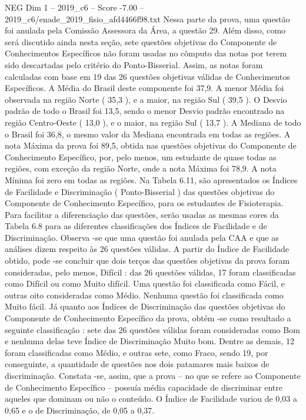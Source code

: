 \begin{textsample}{NEG Dim 1 – 2019\_c6 – Score -7.00 – 2019\_c6/enade\_2019\_fisio\_afd4466f98.txt}
Nessa parte da prova, uma questão foi anulada pela Comissão Assessora da Área, a questão 29.
Além disso, como será discutido ainda nesta seção, sete questões objetivas do Componente de Conhecimentos Específicos não foram usadas no cômputo das notas por terem sido descartadas pelo critério do Ponto-Bisserial.
Assim, as notas foram calculadas com base em 19 das 26 questões objetivas válidas de Conhecimentos Específicos.
A Média do Brasil deste componente foi 37,9.
A menor Média foi observada na região Norte ( 35,3 ), e a maior, na região Sul ( 39,5 ).
O Desvio padrão de todo o Brasil foi 13,5, sendo o menor Desvio padrão encontrado na região Centro-Oeste ( 13,0 ), e o maior, na região Sul ( 13,7 ).
A Mediana de todo o Brasil foi 36,8, o mesmo valor da Mediana encontrada em todas as regiões.
A nota Máxima da prova foi 89,5, obtida nas questões objetivas do Componente de Conhecimento Específico, por, pelo menos, um estudante de quase todas as regiões, com exceção da região Norte, onde a nota Máxima foi 78,9.
A nota Mínima foi zero em todas as regiões.
Na Tabela 6.11, são apresentados os Índices de Facilidade e Discriminação ( Ponto-Bisserial ) das questões objetivas do Componente de Conhecimento Específico, para os estudantes de Fisioterapia.
Para facilitar a diferenciação das questões, serão usadas as mesmas cores da Tabela 6.8 para as diferentes classificações dos Índices de Facilidade e de Discriminação.
Observa -se que uma questão foi anulada pela CAA e que as análises dizem respeito às 26 questões válidas.
A partir do Índice de Facilidade obtido, pode -se concluir que dois terços das questões objetivas da prova foram consideradas, pelo menos, Difícil : das 26 questões válidas, 17 foram classificadas como Difícil ou como Muito difícil.
Uma questão foi classificada como Fácil, e outras oito consideradas como Médio.
Nenhuma questão foi classificada como Muito fácil.
Já quanto aos Índices de Discriminação das questões objetivas do Componente de Conhecimento Específico da prova, obtém -se como resultado a seguinte classificação : sete das 26 questões válidas foram consideradas como Bom e nenhuma delas teve Índice de Discriminação Muito bom.
Dentre as demais, 12 foram classificadas como Médio, e outras sete, como Fraco, sendo 19, por conseguinte, a quantidade de questões nos dois patamares mais baixos de discriminação.
Constata -se, assim, que a prova – no que se refere ao Componente de Conhecimento Específico – possuía média capacidade de discriminar entre aqueles que dominam ou não o conteúdo.
O Índice de Facilidade variou de 0,03 a 0,65 e o de Discriminação, de 0,05 a 0,37.

\end{textsample}
